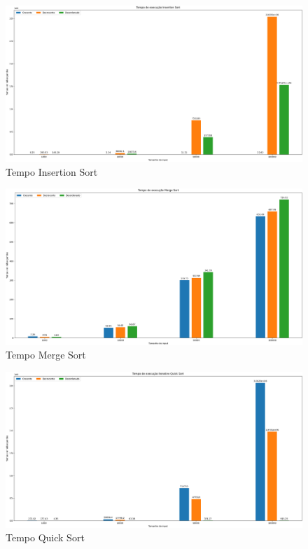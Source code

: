 \documentclass[12pt,a4paper]{article}
\begin{document}
\begin{figure}[H]
    \centering
    \includegraphics[width=\textwidth]{Graficos/Tempos/InsertionSort.png}
    \caption{Tempo Insertion Sort}
    \label{fig:tempInsertionSort}
\end{figure}

\begin{figure}[H]
    \centering
    \includegraphics[width=\textwidth]{Graficos/Tempos/MergeSort.png}
    \caption{Tempo Merge Sort}
    \label{fig:tempMergeSort}
\end{figure}

\begin{figure}[H]
    \centering
    \includegraphics[width=\textwidth]{Graficos/Tempos/QuickSort.png}
    \caption{Tempo Quick Sort}
    \label{fig:tempQuickSort}
\end{figure}
\end{document}
